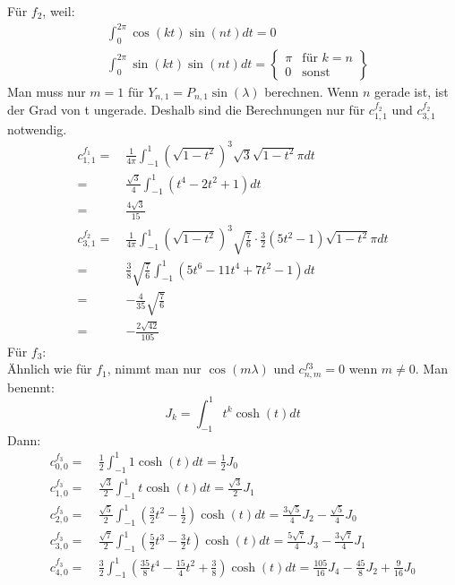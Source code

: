 Für $f_2$, weil:
\begin{align}
	& \int_{0}^{2\pi}\cos(kt)\sin(nt)dt = 0 \\
	& \int_{0}^{2\pi}\sin(kt)\sin(nt)dt = \begin{Bmatrix}
	\pi & \text{für  } k=n \\
	0 &\text{sonst}
	\end{Bmatrix}
\end{align}
Man muss nur $m=1$ für $Y_{n,1} = P_{n,1}\sin(\lambda)$ berechnen. Wenn $n$ gerade ist, ist der Grad von t ungerade. Deshalb sind die Berechnungen nur für $c_{1,1}^{f_2}$ und $c_{3,1}^{f_2}$ notwendig.
\begin{align}
	c_{1,1}^{f_1} = \ & \frac{1}{4\pi}\int_{-1}^{1}\left(\sqrt{1-t^2}\right)^3\sqrt{3}\sqrt{1-t^2}\pi dt\\
	= \ & \frac{\sqrt{3}}{4} \int_{-1}^{1} \left(t^4 - 2t^2 +1\right)dt \\
	= \ & \frac{4\sqrt{3}}{15} \\
	c_{3,1}^{f_2} = \ & \frac{1}{4\pi}\int_{-1}^{1}\left(\sqrt{1-t^2}\right)^3\sqrt{\frac{7}{6}}\cdot \frac{3}{2}\left(5t^2-1\right)\sqrt{1-t^2} \pi dt \\
	= \ & \frac{3}{8}\sqrt{\frac{7}{6}}\int_{-1}^{1}\left(5t^6 - 11t^4 + 7t^2-1\right) dt \\
	= \ & -\frac{4}{35} \sqrt{\frac{7}{6}} \\ 
	= \ & -\frac{2\sqrt{42}}{105}
\end{align}
Für $f_3$:\\
Ähnlich wie für $f_1$, nimmt man nur $\cos(m\lambda)$ und $c_{n,m}^{f3} = 0$ wenn $m \neq 0$. Man benennt:
\begin{equation*}
	J_k = \int_{-1}^{1} t^k \cosh (t) dt
\end{equation*}
Dann:
\begin{align}
	c_{0,0}^{f_3} = \ & \frac{1}{2} \int_{-1}^{1} 1 \cosh (t) dt = \frac{1}{2} J_0 \\
	c_{1,0}^{f_3} = \ & \frac{\sqrt{3}}{2} \int_{-1}^{1} t \cosh (t) dt = \frac{\sqrt{3}}{2}J_1 \\
	c_{2,0}^{f_3} = \ & \frac{\sqrt{5}}{2} \int_{-1}^{1} \left(\frac{3}{2}t^2-\frac{1}{2}\right)\cosh (t) dt = \frac{3\sqrt{5}}{4}J_2-\frac{\sqrt{5}}{4} J_0 \\
	c_{3,0}^{f_3} = \ & \frac{\sqrt{7}}{2} \int_{-1}^{1} \left(\frac{5}{2}t^3 - \frac{3}{2}t\right)\cosh (t) dt = \frac{5\sqrt{7}}{4}J_3 - \frac{3\sqrt{7}}{4} J_1 \\
	c_{4,0}^{f_3} = \ & \frac{3}{2} \int_{-1}^{1} \left(\frac{35}{8}t^4 - \frac{15}{4}t^2 + \frac{3}{8}\right) \cosh (t) dt = \frac{105}{16}J_4 - \frac{45}{8}J_2 + \frac{9}{16}J_0 \\
\end{align}
